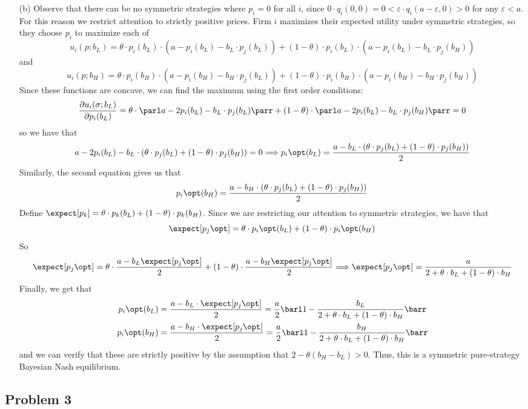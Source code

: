 \documentclass[10pt]{article}
\begin{document}
\begin{itemize}
	\item[(b)] Observe that there can be no symmetric strategies where $p_i = 0$ for all $i$, since $0 \cdot q_i(0,0) = 0 < \varepsilon \cdot q_i(a-\varepsilon,0) > 0$ for any $\varepsilon < a$. For this reason we restrict attention to strictly positive prices. Firm $i$ maximizes their expected utility under symmetric strategies, so they choose $p_i$ to maximize each of\[u_i(p; b_L) = \theta \cdot p_i(b_L)\cdot (a - p_i(b_L) - b_L\cdot p_j(b_L)) + (1-\theta) \cdot p_i(b_L) \cdot (a - p_i(b_L) - b_L\cdot p_j(b_H))\]and \[u_i(p; b_H) = \theta \cdot p_i(b_H)\cdot (a - p_i(b_H) - b_H\cdot p_j(b_L)) + (1-\theta) \cdot p_i(b_H)\cdot (a - p_i(b_H) - b_H\cdot p_j(b_H))\]Since these functions are concave, we can find the maximum using the first order conditions:\[\frac{\partial u_i(\sigma; b_L)}{\partial p_i(b_L)} = \theta\cdot \parl a - 2p_i(b_L) - b_L\cdot p_j(b_L)\parr + (1-\theta) \cdot \parl a - 2p_i(b_L) - b_L\cdot p_j(b_H)\parr = 0\]so we have that\[a - 2p_i(b_L) - b_L\cdot (\theta \cdot p_j(b_L) + (1-\theta) \cdot p_j(b_H)) = 0 \Longrightarrow p_i\opt(b_L) = \frac{a - b_L\cdot (\theta \cdot p_j(b_L) + (1-\theta) \cdot p_j(b_H))}{2}\]Similarly, the second equation gives us that\[p_i\opt(b_H) = \frac{a - b_H\cdot (\theta \cdot p_j(b_L) + (1-\theta) \cdot p_j(b_H))}{2}\]Define $\expect[p_k] = \theta \cdot p_k(b_L) + (1-\theta) \cdot p_k(b_H)$. Since we are restricting our attention to symmetric strategies, we have that \[\expect[p_j\opt] = \theta \cdot p_i\opt(b_L) + (1-\theta) \cdot p_i\opt(b_H)\]So \[\expect[p_j\opt] = \theta \cdot \frac{a - b_L \expect[p_j\opt]}{2} + (1-\theta) \cdot \frac{a - b_H \expect[p_j\opt]}{2} \Longrightarrow \expect[p_j\opt] = \frac{a}{2 + \theta\cdot b_L + (1-\theta)\cdot b_H}\]Finally, we get that\begin{align*} p_i\opt(b_L) &= \frac{a - b_L \cdot \expect[p_j\opt]}{2} = \frac{a}{2}\barl 1 - \frac{b_L}{2+\theta \cdot b_L + (1-\theta) \cdot b_H}\barr \\p_i\opt(b_H) &= \frac{a - b_H \cdot \expect[p_j\opt]}{2} = \frac{a}{2}\barl 1 - \frac{b_H}{2+\theta \cdot b_L + (1-\theta) \cdot b_H}\barr\end{align*}and we can verify that these are strictly positive by the assumption that $2 - \theta(b_H - b_L) > 0$. Thus, this is a symmetric pure-strategy Bayesian Nash equilibrium.
\end{itemize}
\newpage

\subsection*{Problem 3}
\end{document}
